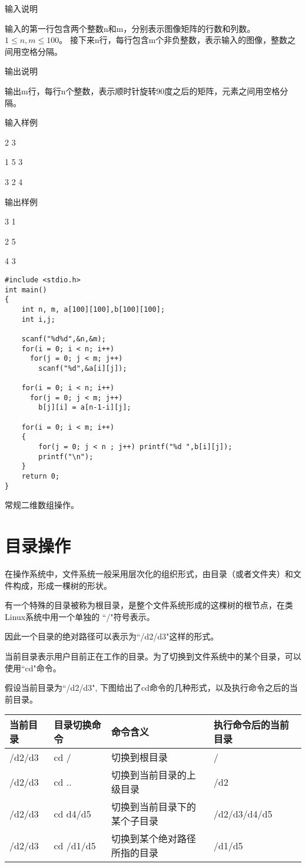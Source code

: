 输入说明	

输入的第一行包含两个整数n和m，分别表示图像矩阵的行数和列数。$1\le n, m\le 100$。
接下来n行，每行包含m个非负整数，表示输入的图像，整数之间用空格分隔。

输出说明
	
输出m行，每行n个整数，表示顺时针旋转90度之后的矩阵，元素之间用空格分隔。

输入样例
	
2 3

1 5 3

3 2 4

输出样例
	
3 1

2 5

4 3	

\begin{lstlisting}
#include <stdio.h>
int main()
{
	int n, m, a[100][100],b[100][100];
	int i,j;
	
	scanf("%d%d",&n,&m);
	for(i = 0; i < n; i++)
	  for(j = 0; j < m; j++)
	    scanf("%d",&a[i][j]); 
	
	for(i = 0; i < n; i++)
	  for(j = 0; j < m; j++)
    	b[j][i] = a[n-1-i][j]; 
	
	for(i = 0; i < m; i++)
	{
		for(j = 0; j < n ; j++) printf("%d ",b[i][j]);
		printf("\n");
	}
	return 0;
}
\end{lstlisting}

\begin{note}[要点]
	常规二维数组操作。
\end{note}

\section{目录操作}
在操作系统中，文件系统一般采用层次化的组织形式，由目录（或者文件夹）和文件构成，形成一棵树的形状。

有一个特殊的目录被称为根目录，是整个文件系统形成的这棵树的根节点，在类Linux系统中用一个单独的 ``/"符号表示。

因此一个目录的绝对路径可以表示为``/d2/d3"这样的形式。

当前目录表示用户目前正在工作的目录。为了切换到文件系统中的某个目录，可以使用``cd"命令。

假设当前目录为``/d2/d3", 下图给出了cd命令的几种形式，以及执行命令之后的当前目录。

\begin{tabular}{|l|l|l|l|}
	\hline 
	\textbf{当前目录} & \textbf{目录切换命令} & \textbf{命令含义} & \textbf{执行命令后的当前目录} \\ 
	\hline 
	/d2/d3 & cd / & 切换到根目录 & / \\ 
	\hline 
	/d2/d3 & cd .. & 切换到当前目录的上级目录 & /d2 \\ 
	\hline 
	/d2/d3 & cd d4/d5 & 切换到当前目录下的某个子目录 & /d2/d3/d4/d5 \\ 
	\hline 
	/d2/d3 & cd /d1/d5 & 切换到某个绝对路径所指的目录 & /d1/d5 \\ 
	\hline 
\end{tabular} 

